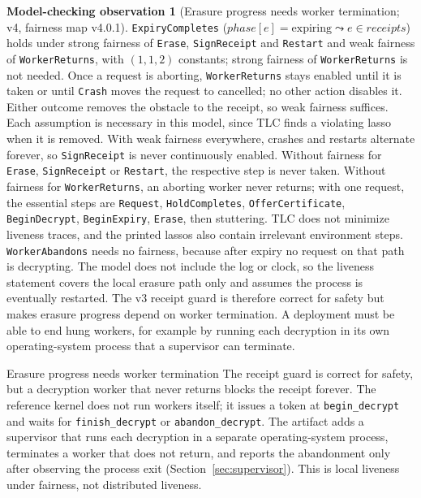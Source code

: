 \documentclass[pdflatex,sn-mathphys-num,twocolumn]{sn-jnl}
\theoremstyle{plain}
\theoremstyle{definition}
\newtheorem{observation}{Model-checking observation}
\newcommand{\code}[1]{\texttt{#1}}
\begin{document}
\begin{observation}[Erasure progress needs worker termination; v4, fairness map v4.0.1]\label{obs:liveness}
\code{ExpiryCompletes} ($\mathit{phase}[e]=\text{expiring}\leadsto e\in\mathit{receipts}$) holds under strong fairness of \code{Erase}, \code{SignReceipt} and \code{Restart} and weak fairness of \code{WorkerReturns}, with $(1,1,2)$ constants; strong fairness of \code{WorkerReturns} is not needed. Once a request is aborting, \code{WorkerReturns} stays enabled until it is taken or until \code{Crash} moves the request to cancelled; no other action disables it. Either outcome removes the obstacle to the receipt, so weak fairness suffices. Each assumption is necessary in this model, since TLC finds a violating lasso when it is removed. With weak fairness everywhere, crashes and restarts alternate forever, so \code{SignReceipt} is never continuously enabled. Without fairness for \code{Erase}, \code{SignReceipt} or \code{Restart}, the respective step is never taken. Without fairness for \code{WorkerReturns}, an aborting worker never returns; with one request, the essential steps are \code{Request}, \code{HoldCompletes}, \code{OfferCertificate}, \code{BeginDecrypt}, \code{BeginExpiry}, \code{Erase}, then stuttering. TLC does not minimize liveness traces, and the printed lassos also contain irrelevant environment steps. \code{WorkerAbandons} needs no fairness, because after expiry no request on that path is decrypting. The model does not include the log or clock, so the liveness statement covers the local erasure path only and assumes the process is eventually restarted. The v3 receipt guard is therefore correct for safety but makes erasure progress depend on worker termination. A deployment must be able to end hung workers, for example by running each decryption in its own operating-system process that a supervisor can terminate.
\end{observation}

\begin{warnbox}{Erasure progress needs worker termination}
The receipt guard is correct for safety, but a decryption worker that never returns blocks the receipt forever. The reference kernel does not run workers itself; it issues a token at \code{begin\_decrypt} and waits for \code{finish\_decrypt} or \code{abandon\_decrypt}. The artifact adds a supervisor that runs each decryption in a separate operating-system process, terminates a worker that does not return, and reports the abandonment only after observing the process exit (Section~\ref{sec:supervisor}). This is local liveness under fairness, not distributed liveness.
\end{warnbox}
\end{document}
